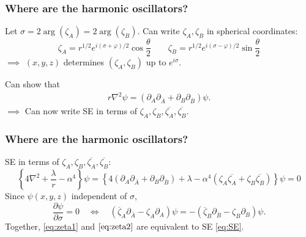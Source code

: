 \documentclass{beamer}
\theoremstyle{definition}
\newcommand{\lc}{\left\{}
\newcommand{\rc}{\right\}}
\newcommand{\p}{\partial}
\newcommand{\f}[2]{\frac{#1}{#2}}
\newcommand{\al}{\alpha}
\begin{document}
\begin{frame}
	\frametitle{Where are the harmonic oscillators? }
	
	Let $\sigma = 2\arg(\zeta_A) = 2\arg(\zeta_B)$. Can write $\zeta_A, \zeta_B$ in spherical coordinates:
	\begin{equation}\label{eq:coords}
	\zeta_A = r^{1/2} e^{i (\sigma + \varphi)/2}   \cos  \f{\theta}{2}  
	\quad\quad 
	\zeta_B = r^{1/2} e^{i(\sigma - \varphi)/2}  \sin \f{\theta}{2} 
	\end{equation}
	$\implies$ $(x,y,z)$ determines $(\zeta_A, \zeta_B)$ up to $e^{i\sigma}$.
	
	
	\vspace{15pt}
	\pause
	
	Can show that
	\begin{align*}
	r \nabla^2 \psi = (\p_A \p_{\bar{A}} + \p_B \p_{\bar{B}}) \psi.
	\end{align*}
	$\implies$ Can now write SE in terms of $\zeta_A, \zeta_B, \overline{\zeta_A}, \overline{\zeta_B}$. 
	
	

\end{frame}


\begin{frame}
	\frametitle{Where are the harmonic oscillators?}
	SE in terms of $\zeta_A, \zeta_B, \overline{\zeta_A}, \overline{\zeta_B}$:
	\begin{equation}
	\label{eq:zeta1}
	\lc 4\nabla^2 + \f{\lambda}{r} -\al^4  \rc \psi 
	= 
	\lc 4 (\p_A \p_{\bar{A}} + \p_B \p_{\bar{B}}) + \lambda - \al^4 (\zeta_A \overline{\zeta_A} + \zeta_B \overline{\zeta_B}) \rc \psi = 0
	\end{equation}
\pause	
	Since $\psi(x,y,z)$ independent of $\sigma$,
	\begin{equation}\label{eq:zeta2}
	\f{\p \psi}{\p \sigma} = 0 \quad \iff \quad 
	(\overline{\zeta}_A \p_{\bar{A}} - \zeta_A \p_{A})\psi =
	-(\overline{\zeta}_B \p_{\bar{B}} - \zeta_B \p_{B})\psi.
	\end{equation}
	\pause
	Together, \eqref{eq:zeta1} and $\eqref{eq:zeta2}$ are equivalent to SE \eqref{eq:SE}. 
\end{frame}
\end{document}

